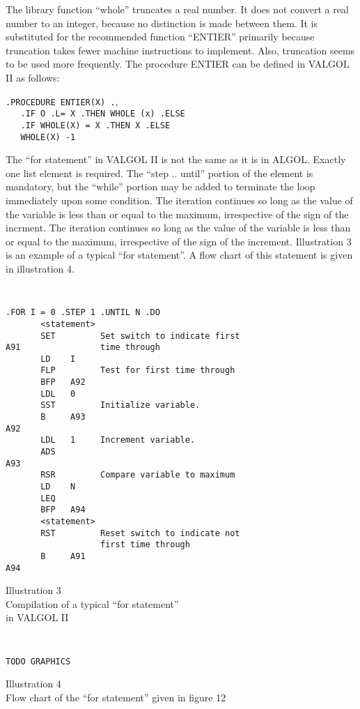 \documentclass[twocolumn]{article}
\begin{document}
The library function ``whole'' truncates a real number.
It does not convert a real number to an integer, because no distinction is made
between them.
It is substituted for the recommended function ``ENTIER'' primarily because
truncation takes fewer machine instructions to implement.
Also, truncation seems to be used more frequently.
The procedure ENTIER can be defined in VALGOL II as follows:

\begin{center}
{\tt .PROCEDURE ENTIER(X) .}, \\
{\tt \ \ \ .IF O .L= X .THEN WHOLE (x) .ELSE} \\
{\tt \ \ \ .IF WHOLE(X) = X .THEN X .ELSE} \\
{\tt \ \ \ WHOLE(X) -1}
\end{center}

The ``for statement'' in VALGOL II is not the same as it is in ALGOL.
Exactly one list element is required.
The ``step .. until'' portion of the element is mandatory, but the ``while''
portion may be added to terminate the loop immediately upon some condition.
The iteration continues so long as the value of the variable is less than
or equal to the maximum, irrespective of the sign of the incrment.
The iteration continues so long as the value of the variable is less than
or equal to the maximum, irrespective of the sign of the increment.
Illustration 3 is an example of a typical ``for statement''.
A flow chart of this statement is given in illustration 4.

\begin{center}
{\tt
\begin{verbatim}
.FOR I = 0 .STEP 1 .UNTIL N .DO
       <statement>
       SET         Set switch to indicate first
A91                time through
       LD    I
       FLP         Test for first time through
       BFP   A92
       LDL   0
       SST         Initialize variable.
       B     A93
A92
       LDL   1     Increment variable.
       ADS
A93
       RSR         Compare variable to maximum
       LD    N
       LEQ
       BFP   A94
       <statement>
       RST         Reset switch to indicate not
                   first time through
       B     A91
A94
\end{verbatim}
}
Illustration 3 \\
Compilation of a typical ``for statement'' \\
in VALGOL II
\end{center}

\begin{center}
{\tt
\begin{verbatim}
TODO GRAPHICS
\end{verbatim}
}
Illustration 4 \\
Flow chart of the ``for statement''
given in figure 12
\end{center}
\end{document}
